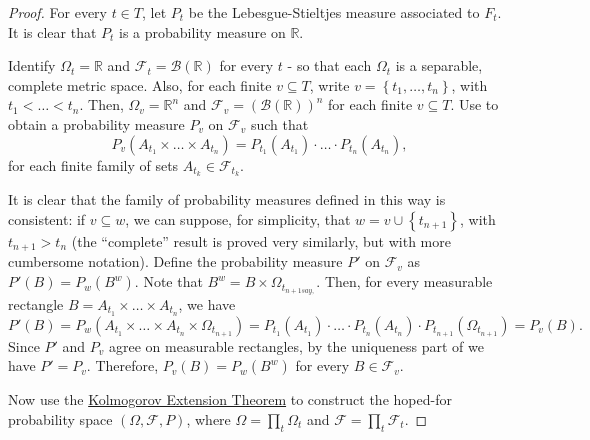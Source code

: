 \begin{proof}
		For every \(t\in T\), let \(P_t\) be the Lebesgue-Stieltjes measure associated to \(F_t\). It is clear that \(P_t\) is a probability measure on \(\mathbb{R}\).

		Identify \(\Omega_t=\mathbb{R}\) and \(\mathcal{F}_t=\mathscr{B}\left(\mathbb{R}\right)\) for every \(t\) - so that each \(\Omega_t\) is a separable, complete metric space. Also, for each finite \(v\subseteq T\), write \(v=\left\{t_1,\dots,t_n\right\}\), with \(t_1<\dots<t_n\). Then, \(\Omega_v=\mathbb{R}^{n}\) and \(\mathcal{F}_v=\left(\mathscr{B}\left(\mathbb{R}\right)\right)^{n}\) for each finite \(v\subseteq T\). Use  to obtain a probability measure \(P_v\) on \(\mathcal{F}_v\) such that
		\[
				P_v\left(A_{t_{1}}\times \dots \times A_{t_{n}}\right)=P_{t_1}(A_{t_1})\cdot\dotsc\cdot P_{t_n}(A_{t_n})
		,\]
		for each finite family of sets \(A_{t_k}\in\mathcal{F}_{t_k}\).

		It is clear that the family of probability measures defined in this way is consistent: if \(v\subseteq w\), we can suppose, for simplicity, that \(w=v\cup\left\{t_{n+1}\right\}\), with \(t_{n+1}>t_n\) (the ``complete'' result is proved very similarly, but with more cumbersome notation). Define the probability measure \(P'\) on \(\mathcal{F}_{v}\) as \(P'(B)=P_{w}(B^w)\). Note that \(B^w=B\times\Omega_{t_{n+1say,}}\). Then, for every measurable rectangle \(B=A_{t_{1}}\times \dots \times A_{t_{n}}\), we have
		\[
				P'(B)=P_w(A_{t_{1}}\times \dots \times A_{t_{n}}\times\Omega_{t_{n+1}})=P_{t_1}(A_{t_{1}})\cdot\dotsc\cdot P_{t_n}(A_{t_{n}})\cdot P_{t_{n+1}}(\Omega_{t_{n+1}})=P_v(B)
		.\]
		Since \(P'\) and \(P_v\) agree on measurable rectangles, by the uniqueness part of  we have \(P'=P_v\). Therefore, \(P_v(B)=P_w(B^w)\) for every \(B\in\mathcal{F}_v\).

		Now use the \hyperref[theorem:Kolmogorov Extension]{Kolmogorov Extension Theorem} to construct the hoped-for probability space \(\left(\Omega,\mathcal{F},P\right)\), where \(\Omega=\prod_{t}\Omega_t\) and \(\mathcal{F}=\prod_{t}\mathcal{F}_t\).


\end{proof}
